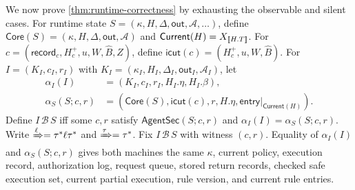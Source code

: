 We now prove \cref{thm:runtime-correctness} by exhausting the observable and silent cases.
For runtime state \(S=(\kappa,H,\Delta,\mathsf{out},\mathcal A,\ldots)\), define \(\mathsf{Core}(S)=(\kappa,H,\Delta,\mathsf{out},\mathcal A)\) and \(\mathsf{Current}(H)=X_{\mathopen{[\![}H.T\mathclose{]\!]}}\).
For \(c=(\mathsf{record}_c,H_c^+,u,W,\widehat B,Z)\), define \(\mathsf{icut}(c)=(H_c^+,u,W,\widehat B)\).
For \(I=(K_I,c_I,r_I)\) with \(K_I=(\kappa_I,H_I,\Delta_I,\mathsf{out}_I,\mathcal A_I)\), let
\[
\begin{aligned}
\alpha_I(I)&=(K_I,c_I,r_I,H_I.\eta,H_I.\beta),\\
\alpha_S(S;c,r)&=(\mathsf{Core}(S),\mathsf{icut}(c),r,
 H.\eta,\mathsf{entry}|_{\mathsf{Current}(H)}).
\end{aligned}
\]
Define \(I\,\mathcal B\,S\) iff some \(c,r\) satisfy \(\mathsf{AgentSec}(S;c,r)\) and \(\alpha_I(I)=\alpha_S(S;c,r)\).
Write \(\xRightarrow{\ell}=\tau^*\ell\tau^*\) and \(\xRightarrow{\tau}=\tau^*\).
Fix \(I\,\mathcal B\,S\) with witness \((c,r)\).
Equality of \(\alpha_I(I)\) and \(\alpha_S(S;c,r)\) gives both machines the same \(\kappa\), current policy, execution record, authorization log, request queue, stored return records, checked safe execution set, current partial execution, rule version, and current rule entries.

